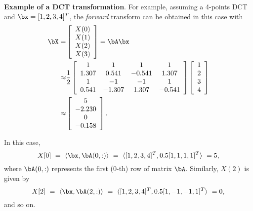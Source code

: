 \bExample \textbf{Example of a DCT transformation}.
For example, assuming a 4-points DCT and $\bx=[1,2,3,4]^T$, the \emph{forward} transform can be obtained in this case with
\begin{align*}
\bX = &
\left[ \begin{array}{c}
 X(0)\\
 X(1)\\
 X(2)\\
 X(3)\\ \end{array} \right] =
 \bA \bx \\
 \approx & \frac{1}{2}
\left[ \begin{array}{cccc}
 1 &  1 & 1 & 1 \\
 1.307 &  0.541 & -0.541 & 1.307 \\
 1 &  -1 & -1 & 1 \\
 0.541 &  -1.307 & 1.307 & -0.541 \\ \end{array} \right]
\left[ \begin{array}{c}
 1\\
 2\\
 3\\
 4\\ \end{array} \right] \\
   \approx &
\left[ \begin{array}{c}
 5\\
 -2.230\\
 0\\
 -0.158\\ \end{array} \right].
\end{align*}

In this case,
\[
X[0] \textrm{~}= \textrm{~}\langle\bx, \bA(0,:)\rangle \textrm{~}=\textrm{~} \langle [1,2,3,4]^T,0.5[1,1,1,1]^T\rangle \textrm{~}= 5,
\]
where $\bA(0,:)$ represents the first (0-th) row of matrix $\bA$. Similarly, $X(2)$ is given by
\[
X[2] \textrm{~}= \textrm{~}\langle\bx, \bA(2,:)\rangle \textrm{~}=\textrm{~} \langle [1,2,3,4]^T,0.5[1,-1,-1,1]^T\rangle\textrm{~} = 0,
\]
and so on.

